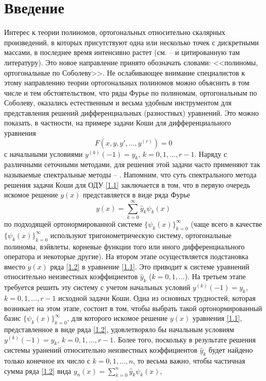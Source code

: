 \section{Введение}
Интерес к теории полиномов, ортогональных относительно скалярных произведений, в которых присутствуют одна или несколько точек  с дискретными массами,  в последнее время интенсивно растет  (см. \cite{KwonLittl1} -- \cite{Shar2016}  и цитированную там литературу).
 Это новое направление принято обозначать словами: <<полиномы, ортогональные по Соболеву>>. Не ослабивающее внимание специалистов  к этому направлению теории ортогональных полиномов можно объяснить в том числе и тем обстоятельством, что ряды Фурье по полиномам, ортогональным по Соболеву, оказались естественным и весьма удобным инструментом для представления решений  дифференциальных (разностных) уравнений. Это можно показать, в частности, на примере  задачи Коши для  дифференциального уравнения
\begin{equation}\label{1.1}
F(x,y,y',\ldots,y^{(r)})=0
 \end{equation}
с начальными условиями $y^{(k)}(-1)=y_k$, $k=0,1,\ldots,r-1$.  Наряду с различными сеточными методами, для решения этой задачи часто применяют так называемые спектральные методы \cite{Tref1} -- \cite{MMG2016}. Напомним, что суть спектрального метода решения задачи Коши  для ОДУ \eqref{1.1} заключается в том, что в первую очередь искомое решение $y(x)$ представляется в виде ряда Фурье
\begin{equation}\label{1.2}
 y(x)=\sum_{k=0}^\infty \hat y_k\psi_k(x)
 \end{equation}
по подходящей ортонормированной системе $\{\psi_k(x)\}_{k=0}^\infty$ (чаще всего в качестве $\{\psi_k(x)\}_{k=0}^\infty$ используют    тригонометрическую систему, ортогональные полиномы, вэйвлеты, корневые функции того или иного дифференциального оператора  и некоторые другие). На втором этапе осуществляется подстановка вместо $y(x)$ ряда \eqref{1.2} в уравнение \eqref{1.1}. Это приводит к системе уравнений относительно неизвестных коэффициентов $\hat y_k$ ($k=0,1,\ldots$). На третьем этапе требуется решить эту систему с учетом начальных условий  $y^{(k)}(-1)=y_k$, $k=0,1,\ldots,r-1$ исходной задачи Коши.
Одна из основных трудностей, которая возникает на этом этапе, состоит в том, чтобы
выбрать такой ортонормированный базис $\{\psi_k(x)\}_{k=0}^\infty$, для которого искомое решение $y(x)$ уравнения \eqref{1.1}, представленное в виде ряда  \eqref{1.2}, удовлетворяло бы начальным условиям $y^{(k)}(-1)=y_k$, $k=0,1,\ldots,r-1$. Более того, поскольку в результате решения системы уранений относительно неизвестных коэффициентов $\hat y_k$  будет найдено только конечное их число с $k=0,1,\ldots, n$, то весьма важно, чтобы частичная сумма ряда \eqref{1.2} вида $ y_n(x)=\sum_{k=0}^n\hat y_k\psi_k(x)$,
